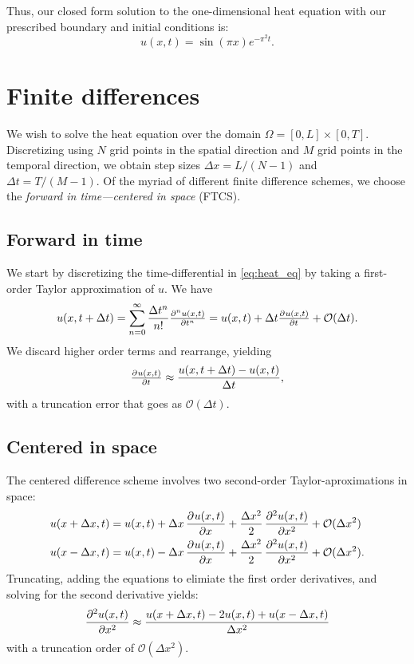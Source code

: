 \documentclass[article, a4paper, oneside]{memoir}
\begin{document}
	Thus, our closed form solution to the one-dimensional heat equation
	with our prescribed boundary and initial conditions is:
	\begin{equation}
		u(x, t) = \sin(\pi x) e^{-\pi^2 t}.
	\end{equation}
	
	\section{Finite differences}

	We wish to solve the heat equation over the domain \( \Omega = [0, L]
	\times [0, T]  \). Discretizing using \( N \) grid points in the
	spatial direction and \( M \) grid points in the temporal direction, we
	obtain step sizes \( \Delta x = L / (N - 1) \) and \( \Delta t = T / (M
	- 1) \). Of the myriad of different finite difference schemes, we
	choose the \emph{forward in time---centered in space} (FTCS).
	
	\subsection{Forward in time}
	We start by discretizing the time-differential in \cref{eq:heat_eq} by
	taking a first-order Taylor approximation of \( u \). We have
	\begin{equation}
		u(x, t + \Delta t) = \sum_{n = 0}^\infty \frac{\Delta t^n}{n!} \pd[n]{u(x, t)}{t} = u(x, t) + \Delta t \pd{u(x, t)}{t} + \mathcal{O}(\Delta t).
	\end{equation}
	We discard higher order terms and rearrange, yielding
	\begin{equation}
		\label{eq:forward_time}
		\pd{u(x, t)}{t} \approx \frac{u(x, t+\Delta t) - u(x, t)}{\Delta t}, 
	\end{equation}
	with a truncation error that goes as \( \mathcal{O}(\Delta t) \).
	
	\subsection{Centered in space}	

	The centered difference scheme involves two second-order
	Taylor-aproximations in space:
	\begin{align}
		u(x + \Delta x, t) &= u(x, t) + \Delta x \dpd{u(x, t)}{x} +
		\frac{\Delta x^2}{2} \dpd[2]{u(x, t)}{x} + \mathcal{O}(\Delta x^2) \\
		u(x - \Delta x, t) &= u(x, t) - \Delta x \dpd{u(x, t)}{x} + \frac{\Delta x^2}{2} \dpd[2]{u(x, t)}{x} + \mathcal{O}(\Delta x^2).
	\end{align}
	Truncating, adding the equations to elimiate the first order
	derivatives, and solving for the second derivative yields:
	\begin{equation}
		\label{eq:centered_space}
		\dpd[2]{u(x, t)}{x} \approx \frac{u(x + \Delta x, t) - 2 u(x,
		t) + u(x - \Delta x, t)}{\Delta x^2}
	\end{equation}
	with a truncation order of \( \mathcal{O}(\Delta x^2) \).
\end{document}

